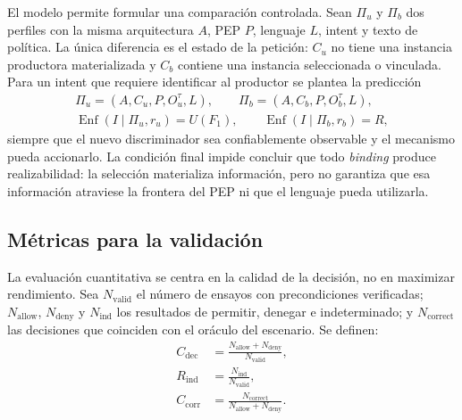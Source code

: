 El modelo permite formular una comparación controlada. Sean $\Pi_u$ y $\Pi_b$ dos perfiles con la misma arquitectura $A$, PEP $P$, lenguaje $L$, intent y texto de política. La única diferencia es el estado de la petición: $C_u$ no tiene una instancia productora materializada y $C_b$ contiene una instancia seleccionada o vinculada. Para un intent que requiere identificar al productor se plantea la predicción
\begin{equation}
\begin{gathered}
    \Pi_u = \left(A,C_u,P,O_u^{\tau},L\right), \qquad
    \Pi_b = \left(A,C_b,P,O_b^{\tau},L\right), \\
    \operatorname{Enf}(I\mid\Pi_u,r_u)=U(F_1), \qquad
    \operatorname{Enf}(I\mid\Pi_b,r_b)=R,
\end{gathered}
    \label{eq:hipotesis-binding}
\end{equation}
%
siempre que el nuevo discriminador sea confiablemente observable y el mecanismo pueda accionarlo. La condición final impide concluir que todo \textit{binding} produce realizabilidad: la selección materializa información, pero no garantiza que esa información atraviese la frontera del PEP ni que el lenguaje pueda utilizarla.

\subsection{Métricas para la validación}
\label{subsec:metricas-validacion}

La evaluación cuantitativa se centra en la calidad de la decisión, no en maximizar rendimiento. Sea $N_{\mathrm{valid}}$ el número de ensayos con precondiciones verificadas; $N_{\mathrm{allow}}$, $N_{\mathrm{deny}}$ y $N_{\mathrm{ind}}$ los resultados de permitir, denegar e indeterminado; y $N_{\mathrm{correct}}$ las decisiones que coinciden con el oráculo del escenario. Se definen:
\begin{align}
    C_{\mathrm{dec}} &=
        \frac{N_{\mathrm{allow}}+N_{\mathrm{deny}}}{N_{\mathrm{valid}}},
    \label{eq:cobertura-decision} \\
    R_{\mathrm{ind}} &=
        \frac{N_{\mathrm{ind}}}{N_{\mathrm{valid}}},
    \label{eq:tasa-indeterminada} \\
    C_{\mathrm{corr}} &=
        \frac{N_{\mathrm{correct}}}{N_{\mathrm{allow}}+N_{\mathrm{deny}}}.
    \label{eq:correccion-decision}
\end{align}

